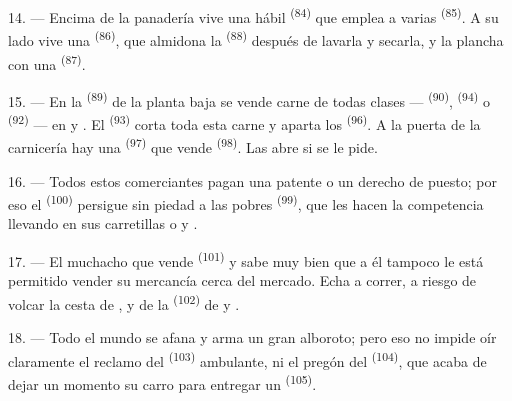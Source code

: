 14. --- Encima de la panadería vive una hábil 
\textsuperscript{(84)} que emplea a varias  \textsuperscript{(85)}. A su
lado vive una  \textsuperscript{(86)}, que almidona la
 \textsuperscript{(88)} después de lavarla y secarla, y la
plancha con una  \textsuperscript{(87)}.

\VUsaut{4.0mm}
\VUsaut{3.0mm}

15. --- En la  \textsuperscript{(89)} de la planta baja se vende
carne de todas clases ---  \textsuperscript{(90)}, 
\textsuperscript{(94)} o  \textsuperscript{(92)} --- en  y . El  \textsuperscript{(93)} corta toda esta carne y aparta los
 \textsuperscript{(96)}. A la puerta de la carnicería hay
una  \textsuperscript{(97)} que vende  \textsuperscript{(98)}.
Las abre si se le pide.

16. --- Todos estos comerciantes pagan una patente o un derecho de puesto;
por eso el  \textsuperscript{(100)} persigue sin piedad a las pobres
 \textsuperscript{(99)}, que les hacen la competencia
llevando en sus carretillas  o
 y .

\VUsaut{4.0mm}
\VUsaut{3.0mm}

17. --- El muchacho que vende  \textsuperscript{(101)} y 
sabe muy bien que a él tampoco le está permitido vender su mercancía cerca
del mercado. Echa a correr, a riesgo de volcar la cesta de
,  y  de la
 \textsuperscript{(102)} de  y
.

18. --- Todo el mundo se afana y arma un gran alboroto; pero eso no impide
oír claramente el reclamo del  \textsuperscript{(103)} ambulante,
ni el pregón del  \textsuperscript{(104)}, que acaba de dejar un
momento su carro para entregar un  \textsuperscript{(105)}.
\VUsaut{6.0mm}
\VUfilet{22mm}
